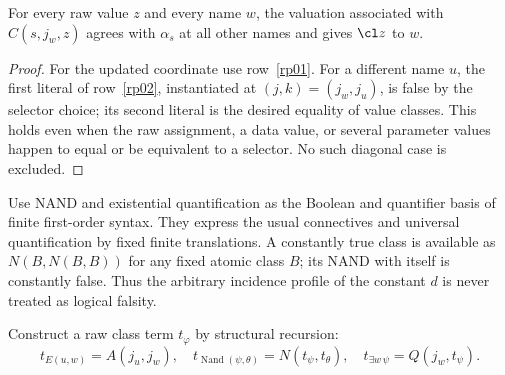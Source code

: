 \begin{lemma}\label{rp-update}
For every raw value $z$ and every name $w$, the valuation associated with
$C(s,j_w,z)$ agrees with $\alpha_s$ at all other names and gives
$\cl z$ to $w$.
\end{lemma}
\begin{proof}
For the updated coordinate use row~\ref{rp01}. For a different name
$u$, the first literal of row~\ref{rp02}, instantiated at
$(j,k)=(j_w,j_u)$, is false by the selector choice; its second literal
is the desired equality of value classes. This holds even when the raw
assignment, a data value, or several parameter values happen to equal or
be equivalent to a selector. No such diagonal case is excluded.
\end{proof}

Use NAND and existential quantification as the Boolean and quantifier
basis of finite first-order syntax. They express the usual connectives
and universal quantification by fixed finite translations. A constantly
true class is available as $N(B,N(B,B))$ for any fixed atomic class $B$;
its NAND with itself is constantly false. Thus the arbitrary incidence
profile of the constant $d$ is never treated as logical falsity.

Construct a raw class term $t_\varphi$ by structural recursion:
\[
 t_{E(u,w)}=A(j_u,j_w),\quad
 t_{\operatorname{Nand}(\psi,\theta)}=N(t_\psi,t_\theta),\quad
 t_{\exists w\,\psi}=Q(j_w,t_\psi).
\]

